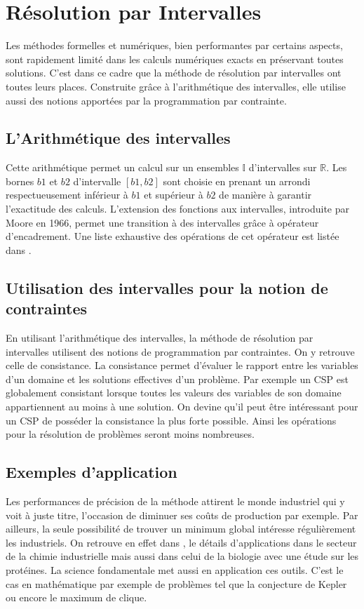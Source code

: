 \section{Résolution par Intervalles}
Les méthodes formelles et numériques, bien performantes par certains aspects, sont rapidement limité dans les calculs numériques exacts en préservant toutes solutions. C'est dans ce cadre que la méthode de résolution par intervalles ont toutes leurs places. Construite grâce à l'arithmétique des intervalles, elle utilise aussi des notions apportées par la programmation par contrainte.
 
\subsection{L'Arithmétique des intervalles}
Cette arithmétique permet un calcul sur un ensembles $\mathbb{I}$ d'intervalles sur $\mathbb{R}$. Les bornes $b1$ et $b2$ d'intervalle $[b1,b2]$ sont choisie en prenant un arrondi respectueusement inférieur à $b1$ et supérieur à $b2$ de manière à garantir l'exactitude des calculs. L'extension des fonctions aux intervalles, introduite par Moore en 1966, permet une transition à des intervalles grâce à opérateur d'encadrement. Une liste exhaustive des opérations de cet opérateur est listée dans \cite{Goualard}.



\subsection{Utilisation des intervalles pour la notion de contraintes}
En utilisant l'arithmétique des intervalles, la méthode de résolution par intervalles utilisent des notions de programmation par contraintes. On y retrouve celle de consistance. La consistance permet d'évaluer le rapport entre les variables d'un domaine et les solutions effectives d'un problème. Par exemple un CSP est globalement consistant lorsque toutes les valeurs des variables de son domaine appartiennent au moins à une solution. On devine qu'il peut être intéressant pour un CSP de posséder la consistance la plus forte possible. Ainsi les opérations pour la résolution de problèmes seront moins nombreuses. 


\subsection{Exemples d'application}
Les performances de précision de la méthode attirent le monde industriel qui y voit à juste titre, l'occasion de diminuer ses coûts de production par exemple. Par ailleurs, la seule possibilité de trouver un minimum global intéresse régulièrement les industriels. On retrouve en effet dans \cite{Schichl}, le détails d'applications dans le secteur de la chimie industrielle mais aussi dans celui de la biologie avec une étude sur les protéines.
 La science fondamentale met aussi en application ces outils. C'est le cas en mathématique par exemple de problèmes tel que la conjecture de Kepler ou encore le  maximum de clique.
